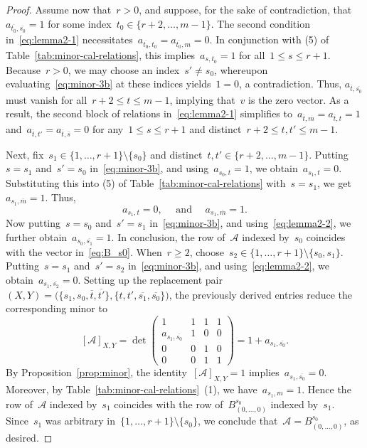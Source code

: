 \documentclass[11pt]{amsart}
\theoremstyle{plain}
\numberwithin{equation}{section}
\theoremstyle{definition}
\newcommand{\cA}{\mathcal{A}}
\begin{document}
\begin{proof}
Assume now that~$r>0$, and suppose, for the sake of contradiction, that~$a_{\overline{t_0},\overline{s_0}}=1$ for some index~$t_0 \in \{r+2,\ldots,m-1\}$.
The second condition in~\eqref{eq:lemma2-1} necessitates~$a_{\overline{t_0},t_0} = a_{\overline{t_0},m} = 0$.
In conjunction with (5) of Table~\ref{tab:minor-cal-relations}, this implies~$a_{s,t_0} = 1$ for all~$1 \leq s \leq r+1$.
Because~$r>0$, we may choose an index~$s'\neq s_0$, whereupon evaluating~\eqref{eq:minor-3b} at these indices yields~$1=0$, a contradiction.
Thus, $a_{\overline{t},\overline{s_0}}$ must vanish for all~$r+2\leq t\leq m-1$, implying that~$v$ is the zero vector.
As a result, the second block of relations in~\eqref{eq:lemma2-1} simplifies to~$a_{\overline{t},m} = a_{\overline{t},t}= 1$ and~$a_{\overline{t},t'} = a_{\overline{t},\overline{s}} = 0$ for any~$1\leq s\leq r+1$ and distinct~$r+2\leq t,t'\leq m-1$.

Next, fix~$s_1 \in\{1,\ldots,r+1\}\setminus\{s_0\}$ and distinct~$t,t'\in\{r+2,\ldots,m-1\}$.
Putting~$s=s_1$ and~$s'=s_0$ in~\eqref{eq:minor-3b}, and using~$a_{s_0,t}=1$, we obtain~$a_{s_1,t}=0$.  
Substituting this into (5) of Table~\ref{tab:minor-cal-relations} with~$s=s_1$, we get~$a_{s_1,\overline{m}}=1$. 
Thus,
\begin{equation}\label{eq:lemma2-2}
    a_{s_1,t}=0, \quad \text{ and } \quad a_{s_1,\overline{m}}=1.
\end{equation}
Now putting~$s=s_0$ and~$s'=s_1$ in~\eqref{eq:minor-3b}, and using~\eqref{eq:lemma2-2}, we further obtain~$a_{s_0,\overline{s_1}}=1$.
In conclusion, the row of~$\cA$ indexed by~$s_0$ coincides with the vector in~\eqref{eq:B_s0}.
When~$r\geq 2$, choose~$s_2\in\{1,\ldots,r+1\}\setminus\{s_0,s_1\}$.
Putting~$s=s_1$ and~$s'=s_2$ in~\eqref{eq:minor-3b}, and using~\eqref{eq:lemma2-2}, we obtain~$a_{s_1,\overline{s_2}}=0$.
Setting up the replacement pair~$(X,Y) = \big(\{s_1,s_0,\overline{t},\overline{t'}\}, \{t,t',\overline{s_1},\overline{s_0}\}\big)$, the previously derived entries reduce the corresponding minor to
$$
    [\cA]_{X,Y} = \det
        \begin{pmatrix}
            1 & 1 & 1 & 1 \\
            a_{s_1,\overline{s_0}} & 1 & 0 & 0 \\
            0 & 0 & 1 & 0 \\
            0 & 0 & 1 & 1
        \end{pmatrix}
    = 1+a_{s_1,\overline{s_0}}.
$$
By Proposition~\ref{prop:minor}, the identity~$[\cA]_{X,Y}=1$ implies~$a_{s_1,\overline{s_0}}=0$.  
Moreover, by Table~\ref{tab:minor-cal-relations}~(1), we have~$a_{s_1,m}=1$.
Hence the row of~$\cA$ indexed by~$s_1$ coincides with the row of~$B_{(0,\ldots,0)}^{s_0}$ indexed by~$s_1$.
Since~$s_1$ was arbitrary in~$\{1,\ldots,r+1\}\setminus\{s_0\}$, we conclude that~$\cA=B_{(0,\ldots,0)}^{s_0}$, as desired.
\end{proof}
\end{document}
